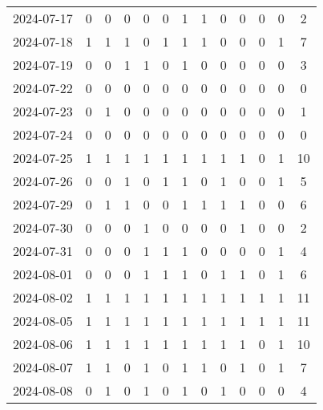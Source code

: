 \documentclass[dvipdfmx,oneside]{article}
\begin{document}
\begin{longtable}{lcccccccccccc}
        2024-07-17 &     0 &     0 &     0 &     0 &     0 &     1 &     1 &     0 &     0 &     0 &     0 &      2 \\
        2024-07-18 &     1 &     1 &     1 &     0 &     1 &     1 &     1 &     0 &     0 &     0 &     1 &      7 \\
        2024-07-19 &     0 &     0 &     1 &     1 &     0 &     1 &     0 &     0 &     0 &     0 &     0 &      3 \\
        2024-07-22 &     0 &     0 &     0 &     0 &     0 &     0 &     0 &     0 &     0 &     0 &     0 &      0 \\
        2024-07-23 &     0 &     1 &     0 &     0 &     0 &     0 &     0 &     0 &     0 &     0 &     0 &      1 \\
        2024-07-24 &     0 &     0 &     0 &     0 &     0 &     0 &     0 &     0 &     0 &     0 &     0 &      0 \\
        2024-07-25 &     1 &     1 &     1 &     1 &     1 &     1 &     1 &     1 &     1 &     0 &     1 &     10 \\
        2024-07-26 &     0 &     0 &     1 &     0 &     1 &     1 &     0 &     1 &     0 &     0 &     1 &      5 \\
        2024-07-29 &     0 &     1 &     1 &     0 &     0 &     1 &     1 &     1 &     1 &     0 &     0 &      6 \\
        2024-07-30 &     0 &     0 &     0 &     1 &     0 &     0 &     0 &     0 &     1 &     0 &     0 &      2 \\
        2024-07-31 &     0 &     0 &     0 &     1 &     1 &     1 &     0 &     0 &     0 &     0 &     1 &      4 \\
        2024-08-01 &     0 &     0 &     0 &     1 &     1 &     1 &     0 &     1 &     1 &     0 &     1 &      6 \\
        2024-08-02 &     1 &     1 &     1 &     1 &     1 &     1 &     1 &     1 &     1 &     1 &     1 &     11 \\
        2024-08-05 &     1 &     1 &     1 &     1 &     1 &     1 &     1 &     1 &     1 &     1 &     1 &     11 \\
        2024-08-06 &     1 &     1 &     1 &     1 &     1 &     1 &     1 &     1 &     1 &     0 &     1 &     10 \\
        2024-08-07 &     1 &     1 &     0 &     1 &     0 &     1 &     1 &     0 &     1 &     0 &     1 &      7 \\
        2024-08-08 &     0 &     1 &     0 &     1 &     0 &     1 &     0 &     1 &     0 &     0 &     0 &      4 \\

\end{longtable}
\end{document}
